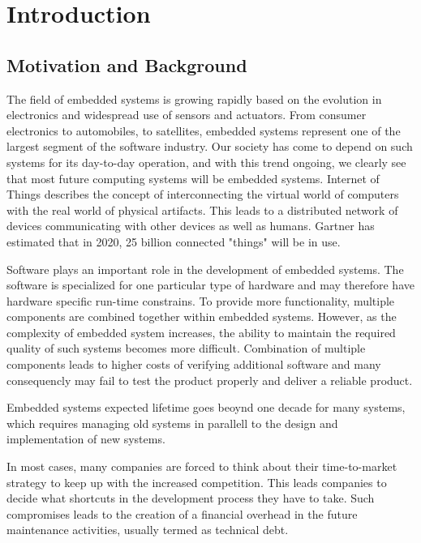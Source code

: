 \chapter{Introduction}

\section{Motivation and Background}
The field of embedded systems is growing rapidly based on the evolution in electronics and widespread use of sensors and actuators. From consumer electronics to automobiles, to satellites, embedded systems represent one of the largest segment of the software industry. Our society has come to depend on such systems for its day-to-day operation, and with this trend ongoing, we clearly see that most future computing systems will be embedded systems\cite{wolfmadsen-2000}. Internet of Things describes the concept of interconnecting the virtual world of computers with the real world of physical artifacts\cite{mattern2010internet}. This leads to a distributed network of devices communicating with other devices as well as humans. Gartner has estimated that in 2020, 25 billion connected "things" will be in use\cite{gartner}. 

Software plays an important role in the development of embedded systems. The software is specialized for one particular type of hardware and may therefore have hardware specific run-time constrains. To provide more functionality, multiple components are combined together within embedded systems. However, as the complexity of embedded system increases, the ability to maintain the required quality of such systems becomes more difficult. Combination of multiple components leads to higher costs of verifying additional software and many consequencly may fail to test the product properly and deliver a reliable product.  

Embedded systems expected lifetime goes beoynd one decade for many systems, which requires managing old systems in parallell to the design and implementation of new systems. 


In most cases, many companies are forced to think about their time-to-market strategy to keep up with the increased competition. This leads companies to decide what shortcuts in the development process they have to take. Such compromises leads to the creation of a financial overhead in the future maintenance activities, usually termed as technical debt\cite{p29-cunningham}. 

